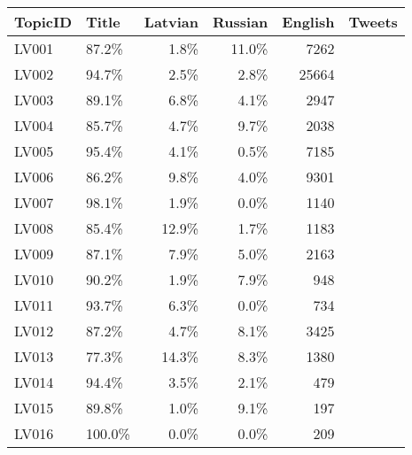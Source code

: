 \begin{tabular}{llrrrr}
\toprule
TopicID & Title & Latvian & Russian & English & Tweets \\
\midrule
LV001    &  87.2\% &  1.8\% & 11.0\% &   7262 \\
LV002    &  94.7\% &  2.5\% &  2.8\% &  25664 \\
LV003    &  89.1\% &  6.8\% &  4.1\% &   2947 \\
LV004    &  85.7\% &  4.7\% &  9.7\% &   2038 \\
LV005    &  95.4\% &  4.1\% &  0.5\% &   7185 \\
LV006    &  86.2\% &  9.8\% &  4.0\% &   9301 \\
LV007    &  98.1\% &  1.9\% &  0.0\% &   1140 \\
LV008    &  85.4\% & 12.9\% &  1.7\% &   1183 \\
LV009    &  87.1\% &  7.9\% &  5.0\% &   2163 \\
LV010    &  90.2\% &  1.9\% &  7.9\% &    948 \\
LV011    &  93.7\% &  6.3\% &  0.0\% &    734 \\
LV012    &  87.2\% &  4.7\% &  8.1\% &   3425 \\
LV013    &  77.3\% & 14.3\% &  8.3\% &   1380 \\
LV014    &  94.4\% &  3.5\% &  2.1\% &    479 \\
LV015    &  89.8\% &  1.0\% &  9.1\% &    197 \\
LV016    & 100.0\% &  0.0\% &  0.0\% &    209 \\
\bottomrule
\end{tabular}
